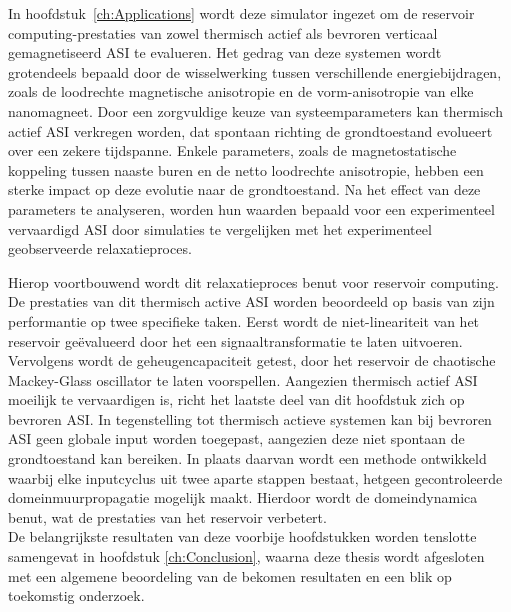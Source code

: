 In hoofdstuk~\ref{ch:Applications} wordt deze \hotspice simulator ingezet om de reservoir computing-prestaties van zowel thermisch actief als bevroren verticaal gemagnetiseerd ASI te evalueren.
Het gedrag van deze systemen wordt grotendeels bepaald door de wisselwerking tussen verschillende energiebijdragen, zoals de loodrechte magnetische anisotropie en de vorm-anisotropie van elke nanomagneet.
Door een zorgvuldige keuze van systeemparameters kan thermisch actief ASI verkregen worden, dat spontaan richting de grondtoestand evolueert over een zekere tijdspanne.
Enkele parameters, zoals de magnetostatische koppeling tussen naaste buren en de netto loodrechte anisotropie, hebben een sterke impact op deze evolutie naar de grondtoestand.
Na het effect van deze parameters te analyseren, worden hun waarden bepaald voor een experimenteel vervaardigd ASI door simulaties te vergelijken met het experimenteel geobserveerde relaxatieproces. \par
Hierop voortbouwend wordt dit relaxatieproces benut voor reservoir computing.
De prestaties van dit thermisch active ASI worden beoordeeld op basis van zijn performantie op twee specifieke taken.
Eerst wordt de niet-lineariteit van het reservoir ge\"evalueerd door het een signaaltransformatie te laten uitvoeren.
Vervolgens wordt de geheugencapaciteit getest, door het reservoir de chaotische Mackey-Glass oscillator te laten voorspellen.
Aangezien thermisch actief ASI moeilijk te vervaardigen is, richt het laatste deel van dit hoofdstuk zich op bevroren ASI.
In tegenstelling tot thermisch actieve systemen kan bij bevroren ASI geen globale input worden toegepast, aangezien deze niet spontaan de grondtoestand kan bereiken.
In plaats daarvan wordt een methode ontwikkeld waarbij elke inputcyclus uit twee aparte stappen bestaat, hetgeen gecontroleerde domeinmuurpropagatie mogelijk maakt.
Hierdoor wordt de domeindynamica benut, wat de prestaties van het reservoir verbetert. \\

De belangrijkste resultaten van deze voorbije hoofdstukken worden tenslotte samengevat in hoofdstuk \ref{ch:Conclusion}, waarna deze thesis wordt afgesloten met een algemene beoordeling van de bekomen resultaten en een blik op toekomstig onderzoek.
